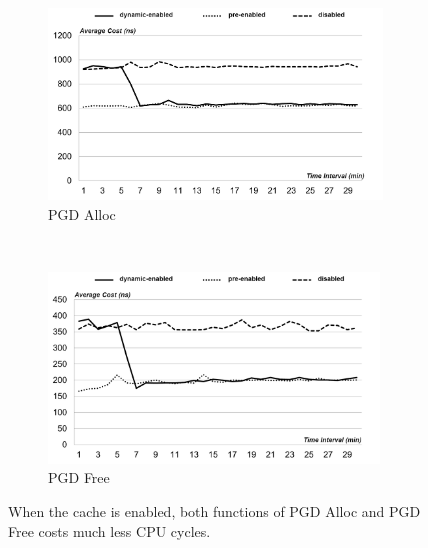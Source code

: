 \begin{figure}[t!]
    \centering
    \begin{subfigure}[t]{0.5\textwidth}
        \centering
        \includegraphics[height=2.0in]{image/micro/PGDalloc.png}
        \caption{PGD Alloc}
        \label{fig:subfig:a}
    \end{subfigure}%
    ~
    \begin{subfigure}[t]{0.5\textwidth}
        \centering
        \includegraphics[height=2.0in]{image/micro/PGDfree.png}
        \caption{PGD Free}
        \label{fig:subfig:b}
    \end{subfigure}
    \caption{When the cache is enabled, both functions of PGD Alloc and PGD Free costs much less CPU cycles.}
    \label{fig:PGDtime}
\end{figure}

